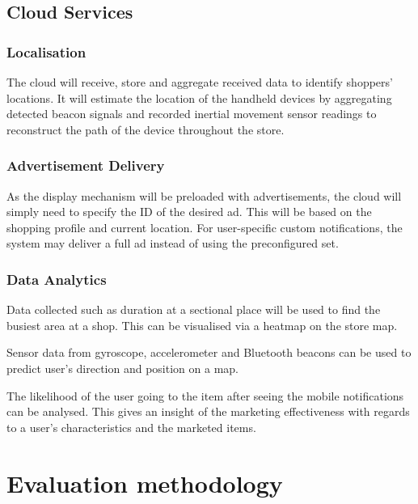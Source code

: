 \documentclass[11pt,]{article}
\begin{document}
\hypertarget{cloud-services}{%
\subsection{Cloud Services}\label{cloud-services}}

\hypertarget{localisation}{%
\subsubsection{Localisation}\label{localisation}}

The cloud will receive, store and aggregate received data to identify
shoppers' locations. It will estimate the location of the handheld
devices by aggregating detected beacon signals and recorded inertial
movement sensor readings to reconstruct the path of the device
throughout the store.

\hypertarget{advertisement-delivery}{%
\subsubsection{Advertisement Delivery}\label{advertisement-delivery}}

As the display mechanism will be preloaded with advertisements, the
cloud will simply need to specify the ID of the desired ad. This will be
based on the shopping profile and current location. For user-specific
custom notifications, the system may deliver a full ad instead of using
the preconfigured set.

\hypertarget{data-analytics}{%
\subsubsection{Data Analytics}\label{data-analytics}}

Data collected such as duration at a sectional place will be used to
find the busiest area at a shop. This can be visualised via a heatmap on
the store map.

Sensor data from gyroscope, accelerometer and Bluetooth beacons can be
used to predict user's direction and position on a map.

The likelihood of the user going to the item after seeing the mobile
notifications can be analysed. This gives an insight of the marketing
effectiveness with regards to a user's characteristics and the marketed
items.

\hypertarget{evaluation-methodology}{%
\section{Evaluation methodology}\label{evaluation-methodology}}
\end{document}
